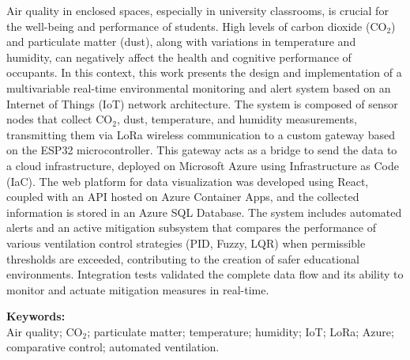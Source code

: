
Air quality in enclosed spaces, especially in university classrooms, is crucial for the well-being and performance of students. High levels of carbon dioxide (CO\(_2\)) and particulate matter (dust), along with variations in temperature and humidity, can negatively affect the health and cognitive performance of occupants. In this context, this work presents the design and implementation of a multivariable real-time environmental monitoring and alert system based on an Internet of Things (IoT) network architecture. The system is composed of sensor nodes that collect CO\(_2\), dust, temperature, and humidity measurements, transmitting them via LoRa wireless communication to a custom gateway based on the ESP32 microcontroller. This gateway acts as a bridge to send the data to a cloud infrastructure, deployed on Microsoft Azure using Infrastructure as Code (IaC). The web platform for data visualization was developed using React, coupled with an API hosted on Azure Container Apps, and the collected information is stored in an Azure SQL Database. The system includes automated alerts and an active mitigation subsystem that compares the performance of various ventilation control strategies (PID, Fuzzy, LQR) when permissible thresholds are exceeded, contributing to the creation of safer educational environments. Integration tests validated the complete data flow and its ability to monitor and actuate mitigation measures in real-time.

\noindent \textbf{Keywords:}\\
\noindent Air quality; CO\(_2\); particulate matter; temperature; humidity; IoT; LoRa; Azure; comparative control; automated ventilation.
